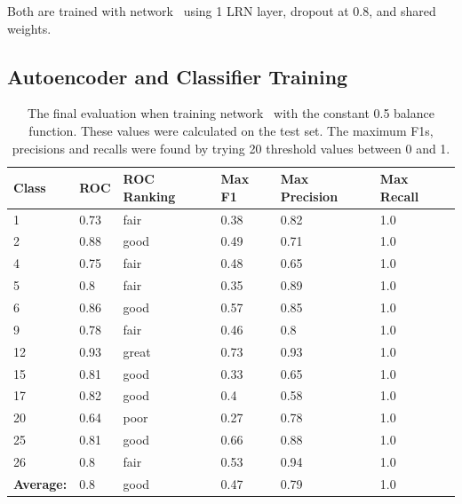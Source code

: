       Both are trained with network \networkII\ using 1 LRN layer, dropout at 0.8,
      and shared weights.

      \subsection{Autoencoder and Classifier Training}

        \begin{table}[!h]
        \centering
        {\footnotesize
        \begin{tabular}{llllll}
        \hline
        \textbf{Class}    & \textbf{ROC} & \textbf{ROC Ranking} & \textbf{Max F1} & \textbf{Max Precision} & \textbf{Max Recall} \\ \hline
        1                 & 0.73 	&fair 	&0.38 	&0.82 &	1.0      \\
        2                 & 0.88 	&good 	&0.49 	&0.71 &	1.0      \\
        4                 & 0.75 	&fair 	&0.48 	&0.65 &	1.0      \\
        5                 & 0.8 	&fair 	&0.35 	&0.89 &	1.0      \\
        6                 & 0.86 	&good 	&0.57 	&0.85 &	1.0      \\
        9                 & 0.78  &	fair  &	0.46  &	0.8 &	1.0      \\
        12                & 0.93 	&great  &0.73 	&0.93 &	1.0      \\
        15                & 0.81 	&good 	&0.33 	&0.65 &	1.0      \\
        17                & 0.82  &good   &0.4 	  &0.58 &	1.0      \\
        20                & 0.64 	&poor 	&0.27 	&0.78 &	1.0      \\
        25                & 0.81 	&good 	&0.66 	&0.88 &	1.0      \\
        26                & 0.8 	&fair 	&0.53 	&0.94 &	1.0      \\ \hline
        \textbf{Average:} & 0.8 	&good 	&0.47 	&0.79 &	1.0      \\ \hline
        \end{tabular} }
        \caption{The final evaluation when training network \networkII\ with the constant 0.5 balance function.
        These values were
        calculated on the test set. The maximum F1s, precisions and recalls
        were found by trying 20 threshold values between 0 and 1.}
        \label{tab:biglisiiit}
        \end{table}


